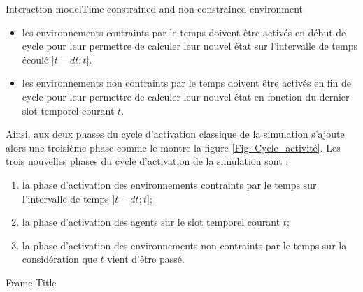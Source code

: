 \begin{frame}{Interaction model}{Time constrained and non-constrained environment}
{\begin{itemize}
    \item les environnements contraints par le temps doivent être activés en début de cycle pour leur permettre de calculer leur nouvel état sur l'intervalle de temps écoulé $]t-dt ; t]$.
    \item les environnements non contraints par le temps doivent être activés en fin de cycle pour leur permettre de calculer leur nouvel état en fonction du dernier slot temporel courant $t$.
\end{itemize}
\par Ainsi, aux deux phases du cycle d'activation classique de la simulation s'ajoute alors une troisième phase comme le montre la figure \ref{Fig: Cycle_activité}. Les trois nouvelles phases du cycle d'activation de la simulation sont :
\begin{enumerate}
    \item la phase d'activation des environnements contraints par le temps sur l'intervalle de temps $]t-dt ; t]$; 
    \item la phase d'activation des agents sur le slot temporel courant $t$;
    \item la phase d'activation des environnements non contraints par le temps sur la considération que $t$ vient d'être passé.
\end{enumerate}
}
    
\end{frame}

\begin{frame}{Frame Title}
    
\end{frame}